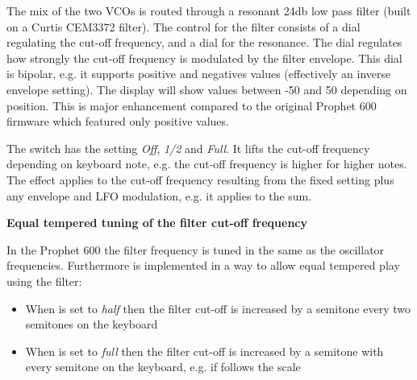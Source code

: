 The mix of the two VCOs is routed through a resonant 24db low pass filter (built on a Curtis CEM3372 filter). The control for the filter consists of a \filtercutoff dial regulating the cut-off frequency, and a \filterres dial for the resonance. The \filterenv dial regulates how strongly the cut-off frequency is modulated by the filter envelope. This dial is bipolar, e.g. it supports positive and negatives values (effectively an inverse envelope setting). The display will show values between -50 and 50 depending on position. This is major enhancement compared to the original Prophet 600 firmware which  featured only positive values.

\begin{center}
\end{center}

The \keyboardtrack switch has the setting \textit{Off}, \textit{1/2} and \textit{Full}. It lifts the cut-off frequency depending on keyboard note, e.g. the cut-off frequency is higher for higher notes. The effect applies to the cut-off frequency resulting from the fixed \filtercutoff setting plus any envelope and LFO modulation, e.g. it applies to the sum.  

\textbf{Equal tempered tuning of the filter cut-off frequency}

In the Prophet 600 the filter frequency is tuned in the same as the oscillator frequencies. Furthermore \keyboardtrack is implemented in a way to allow equal tempered play using the filter:

\begin{itemize}
  \item When \keyboardtrack is set to \textit{half} then the filter cut-off is increased by a semitone every two semitones on the keyboard 
  \item When \keyboardtrack is set to \textit{full} then the filter cut-off is increased by a semitone with every semitone on the keyboard, e.g. if follows the scale 
\end{itemize}

